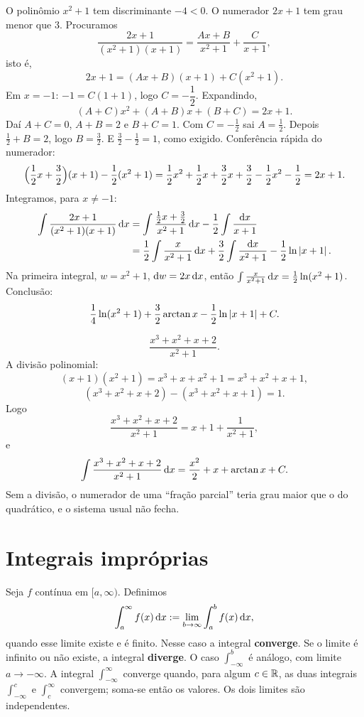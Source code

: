 \documentclass[11pt,a4paper]{article}
\begin{document}
\begin{exemplo}
O polinômio \(x^{2}+1\) tem discriminante \(-4<0\). O numerador \(2x+1\) tem grau menor que \(3\). Procuramos
\[
\frac{2x+1}{(x^{2}+1)(x+1)}=\frac{Ax+B}{x^{2}+1}+\frac{C}{x+1},
\]
isto é,
\[
2x+1=(Ax+B)(x+1)+C(x^{2}+1).
\]
Em \(x=-1\): \(-1=C(1+1)\), logo \(C=-\dfrac12\). Expandindo,
\[
(A+C)x^{2}+(A+B)x+(B+C)=2x+1.
\]
Daí \(A+C=0\), \(A+B=2\) e \(B+C=1\). Com \(C=-\frac12\) sai \(A=\frac12\). Depois \(\frac12+B=2\), logo \(B=\frac32\). E \(\frac32-\frac12=1\), como exigido. Conferência rápida do numerador:
\[
\Bigl(\frac12 x+\frac32\Bigr)(x+1)-\frac12(x^{2}+1)
=\frac12 x^{2}+\frac12 x+\frac32 x+\frac32-\frac12 x^{2}-\frac12
=2x+1.
\]
Integramos, para \(x\neq -1\):
\begin{align*}
\int\frac{2x+1}{(x^{2}+1)(x+1)}\,\mathrm{d} x
&=\int\frac{\frac12 x+\frac32}{x^{2}+1}\,\mathrm{d} x-\frac12\int\frac{\mathrm{d} x}{x+1}\\
&=\frac12\int\frac{x}{x^{2}+1}\,\mathrm{d} x+\frac32\int\frac{\mathrm{d} x}{x^{2}+1}-\frac12\ln\left\lvert x+1 \right\rvert.
\end{align*}
Na primeira integral, \(w=x^{2}+1\), \(\mathrm{d} w=2x\,\mathrm{d} x\), então \(\int\frac{x}{x^{2}+1}\,\mathrm{d} x=\frac12\ln(x^{2}+1)\). Conclusão:
\[
\frac14\ln(x^{2}+1)+\frac32\arctan x-\frac12\ln\left\lvert x+1 \right\rvert+C.
\]
\end{exemplo}

\begin{exemplo}
\[
\frac{x^{3}+x^{2}+x+2}{x^{2}+1}.
\]
A divisão polinomial:
\[
(x+1)(x^{2}+1)=x^{3}+x+x^{2}+1=x^{3}+x^{2}+x+1,
\]
\[
(x^{3}+x^{2}+x+2)-(x^{3}+x^{2}+x+1)=1.
\]
Logo
\[
\frac{x^{3}+x^{2}+x+2}{x^{2}+1}=x+1+\frac{1}{x^{2}+1},
\]
e
\[
\int\frac{x^{3}+x^{2}+x+2}{x^{2}+1}\,\mathrm{d} x
=\frac{x^{2}}{2}+x+\arctan x+C.
\]
Sem a divisão, o numerador de uma ``fração parcial'' teria grau maior que o do quadrático, e o sistema usual não fecha.
\end{exemplo}

\section{Integrais impróprias}

\begin{definicao}[Tipo I]
Seja \(f\) contínua em \([a,\infty)\). Definimos
\[
\int_a^{\infty} f(x)\,\mathrm{d} x
:=\lim_{b\to\infty}\int_a^{b} f(x)\,\mathrm{d} x,
\]
quando esse limite existe e é finito. Nesse caso a integral \textbf{converge}. Se o limite é infinito ou não existe, a integral \textbf{diverge}. O caso \(\int_{-\infty}^{b}\) é análogo, com limite \(a\to-\infty\). A integral \(\int_{-\infty}^{\infty}\) converge quando, para algum \(c\in\mathbb{R}\), as duas integrais \(\int_{-\infty}^{c}\) e \(\int_{c}^{\infty}\) convergem; soma-se então os valores. Os dois limites são independentes.
\end{definicao}
\end{document}
